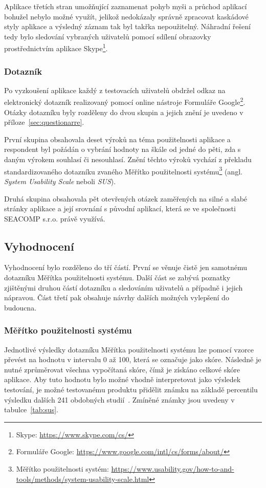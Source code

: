 Aplikace třetích stran umožňující zaznamenat pohyb myši a průchod aplikací bohužel nebylo možné využít, jelikož nedokázaly správně zpracovat kaskádové styly aplikace a výsledný záznam tak byl takřka nepoužitelný. Náhradní řešení tedy bylo sledování vybraných uživatelů pomocí sdílení obrazovky prostřednictvím aplikace Skype\footnote{Skype: \url{https://www.skype.com/cs/}}.

\subsubsection{Dotazník}
Po vyzkoušení aplikace každý z testovacích uživatelů obdržel odkaz na elektronický dotazník realizovaný pomocí online nástroje Formuláře Google\footnote{Formuláře Google: \url{https://www.google.com/intl/cs/forms/about/}}. Otázky dotazníku byly rozděleny do dvou skupin a jejich znění je uvedeno v příloze~\ref{sec:questionarre}.

První skupina obsahovala deset výroků na téma použitelnosti aplikace a respondent byl požádán o vybrání hodnoty na škále od jedné do pěti, zda s daným výrokem souhlasí či nesouhlasí. Znění těchto výroků vychází z překladu standardizovaného dotazníku zvaného Měřítko použitelnosti systému\footnote{Měřítko použitelnosti systém: \url{https://www.usability.gov/how-to-and-tools/methods/system-usability-scale.html}} (angl. \emph{System Usability Scale} neboli \emph{SUS}).

Druhá skupina obsahovala pět otevřených otázek zaměřených na silné a slabé stránky aplikace a její srovnání s původní aplikací, která se ve společnosti SEACOMP s.r.o. právě využívá.



\subsection{Vyhodnocení}
Vyhodnocení bylo rozděleno do tří částí. První se věnuje čistě jen samotnému dotazníku Měřítka použitelnosti systému. Další část se zabývá poznatky zjištěnými druhou částí dotazníku a sledováním uživatelů a případně i jejich nápravou. Část třetí pak obsahuje návrhy dalších možných vylepšení do budoucna. 


\subsubsection{Měřítko použitelnosti systému}
Jednotlivé výsledky dotazníku Měřítka použitelnosti systému lze pomocí vzorce převést na hodnotu v intervalu 0 až 100, která se označuje jako skóre. Následně je nutné zprůměrovat všechna vypočítaná skóre, čímž je získáno celkové skóre aplikace. Aby tuto hodnotu bylo možné vhodně interpretovat jako výsledek testování, je možné testovanému produktu přidělit známku na základě percentilu výsledku dalších 241 obdobných studií~\cite{bib:sus-statistics}. Zmíněné známky jsou uvedeny v tabulce~\ref{tab:sus}.

